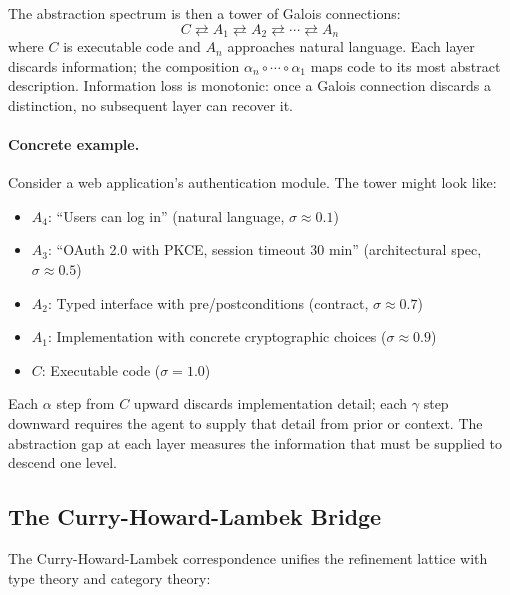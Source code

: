 The abstraction spectrum is then a tower of Galois connections:
\begin{equation}
    C \rightleftarrows A_1 \rightleftarrows A_2 \rightleftarrows \cdots \rightleftarrows A_n
\end{equation}
where $C$ is executable code and $A_n$ approaches natural language. Each layer discards information; the composition $\alpha_n \circ \cdots \circ \alpha_1$ maps code to its most abstract description. Information loss is monotonic: once a Galois connection discards a distinction, no subsequent layer can recover it.

\paragraph{Concrete example.} Consider a web application's authentication module. The tower might look like:
\begin{itemize}[nosep]
    \item $A_4$: ``Users can log in'' (natural language, $\sigma \approx 0.1$)
    \item $A_3$: ``OAuth 2.0 with PKCE, session timeout 30 min'' (architectural spec, $\sigma \approx 0.5$)
    \item $A_2$: Typed interface with pre/postconditions (contract, $\sigma \approx 0.7$)
    \item $A_1$: Implementation with concrete cryptographic choices ($\sigma \approx 0.9$)
    \item $C$: Executable code ($\sigma = 1.0$)
\end{itemize}
Each $\alpha$ step from $C$ upward discards implementation detail; each $\gamma$ step downward requires the agent to supply that detail from prior or context. The abstraction gap at each layer measures the information that must be supplied to descend one level.

\subsection{The Curry-Howard-Lambek Bridge}

The Curry-Howard-Lambek correspondence \citep{martinlof1979constructive, wadler2015propositions, lambek1986higher} unifies the refinement lattice with type theory and category theory:

